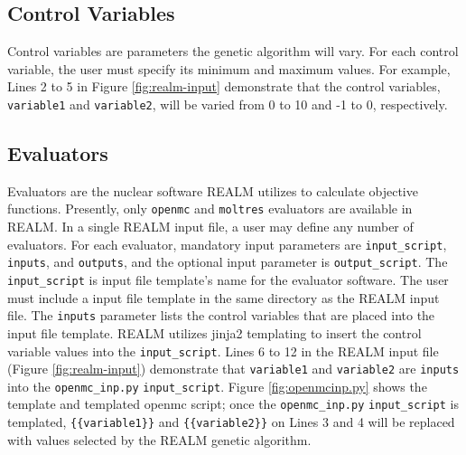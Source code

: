 \subsection{Control Variables}
Control variables are parameters the genetic algorithm will vary. 
For each control variable, the user must specify its minimum and maximum values.
For example, Lines 2 to 5 in Figure \ref{fig:realm-input} demonstrate that the 
control variables, \texttt{variable1} and \texttt{variable2}, 
will be varied from 0 to 10 and -1 to 0, respectively. 

\subsection{Evaluators}
Evaluators are the nuclear software REALM utilizes to calculate objective functions. 
Presently, only \texttt{openmc} and \texttt{moltres} evaluators are available 
in REALM.
In a single REALM input file, a user may define any number of evaluators. 
For each evaluator, mandatory input parameters are \texttt{input\_script}, 
\texttt{inputs}, and \texttt{outputs}, and the optional input parameter is
\texttt{output\_script}. 
The \texttt{input\_script} is input file template's name for the evaluator software. 
The user must include a input file template in the same directory as the REALM input 
file. 
The \texttt{inputs} parameter lists the control variables that are placed into the 
input file template. 
REALM utilizes jinja2 templating to insert the control variable values into the 
\texttt{input\_script}. 
Lines 6 to 12 in the REALM input file (Figure \ref{fig:realm-input}) demonstrate 
that \texttt{variable1} and \texttt{variable2} are \texttt{inputs} into the 
\texttt{openmc\_inp.py} \texttt{input\_script}. 
Figure \ref{fig:openmcinp.py} shows the template and templated openmc script; 
once the \texttt{openmc\_inp.py} \texttt{input\_script} is templated, 
\texttt{\{\{variable1\}\}} and \texttt{\{\{variable2\}\}}  on Lines 3 and 4 will be 
replaced with values selected by the REALM genetic algorithm. 
